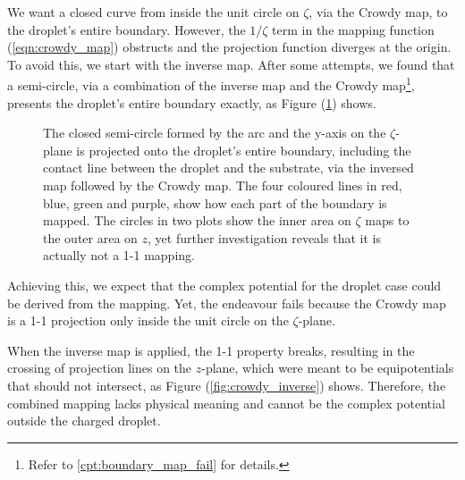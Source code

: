 We want a closed curve from inside the unit circle on $\zeta$, via the Crowdy map, to the droplet's entire boundary. However, the $1/\zeta$ term in the mapping function (\ref{eqn:crowdy_map}) obstructs and the projection function diverges at the origin. To avoid this, we start with the inverse map. After some attempts, we found that a semi-circle, via a combination of the inverse map and the Crowdy map\footnote{Refer to \ref{cpt:boundary_map_fail} for details.}, presents the droplet's entire boundary exactly, as Figure (\ref{fig:droplet_entire_boundary}) shows.
\begin{figure}[h]
\centering
{}
\caption{\small The closed semi-circle formed by the arc and the y-axis on the $\zeta$-plane is projected onto the droplet's entire boundary, including the contact line between the droplet and the substrate, via the inversed map followed by the Crowdy map. The four coloured lines in red, blue, green and purple, show how each part of the boundary is mapped. The circles in two plots show the inner area on $\zeta$ maps to the outer area on $z$, yet further investigation reveals that it is actually not a 1-1 mapping.}
\label{fig:droplet_entire_boundary}
\end{figure}

Achieving this, we expect that the complex potential for the droplet case could be derived from the mapping. Yet, the endeavour fails because the Crowdy map is a 1-1 projection only inside the unit circle on the $\zeta$-plane. 

When the inverse map is applied, the 1-1 property breaks, resulting in the crossing of projection lines on the $z$-plane, which were meant to be equipotentials that should not intersect, as Figure (\ref{fig:crowdy_inverse}) shows. Therefore, the combined mapping lacks physical meaning and cannot be the complex potential outside the charged droplet.

